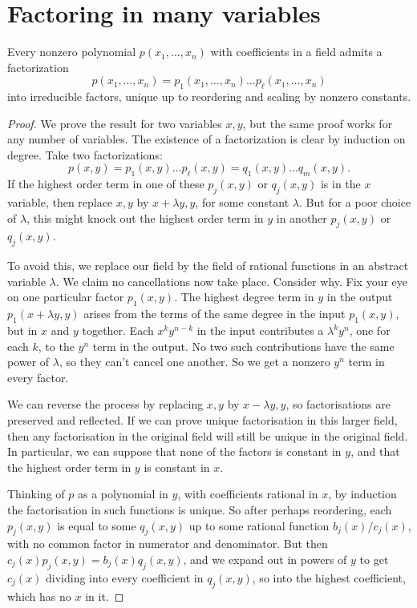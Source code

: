 \section{Factoring in many variables}
\begin{theorem}\label{theorem:ufd}
Every nonzero polynomial \(p(x_1,\dots,x_n)\) with coefficients in a field admits a factorization
\[
p(x_1,\dots,x_n)=p_1(x_1,\dots,x_n)\dots p_{\ell}(x_1,\dots,x_n)
\]
into irreducible factors, unique up to reordering and scaling by nonzero constants.
\end{theorem}
\begin{proof}
We prove the result for two variables \(x,y\), but the same proof works for any number of variables.
The existence of a factorization is clear by induction on degree.
Take two factorizations:
\[
p(x,y)=p_1(x,y)\dots p_{\ell}(x,y)=q_1(x,y)\dots q_m(x,y).
\]
If the highest order term in one of these \(p_j(x,y)\) or \(q_j(x,y)\) is in the \(x\) variable, then replace \(x,y\) by \(x+\lambda y,y\), for some constant \(\lambda\).
But for a poor choice of \(\lambda\), this might knock out the highest order term in \(y\) in another \(p_j(x,y)\) or \(q_j(x,y)\).

To avoid this, we replace our field by the field of rational functions in an abstract variable \(\lambda\).
We claim no cancellations now take place.
Consider why.
Fix your eye on one particular factor \(p_1(x,y)\).
The highest degree term in \(y\) in the output \(p_1(x+\lambda y,y)\) arises from the terms of the same degree in the input \(p_1(x,y)\), but in \(x\) and \(y\) together.
Each \(x^ky^{n-k}\) in the input contributes a \(\lambda^k y^n\), one for each \(k\), to the \(y^n\) term in the output.
No two such contributions have the same power of \(\lambda\), so they can't cancel one another.
So we get a nonzero \(y^n\) term in every factor.

We can reverse the process by replacing \(x,y\) by \(x-\lambda y,y\), so factorisations are preserved and reflected.
If we can prove unique factorisation in this larger field, then any factorisation in the original field will still be unique in the original field.
In particular, we can suppose that none of the factors is constant in \(y\), and that the highest order term in \(y\) is constant in \(x\).

Thinking of \(p\) as a polynomial in \(y\), with coefficients rational in \(x\), by induction the factorisation in such functions is unique.
So after perhaps reordering, each \(p_j(x,y)\) is equal to some \(q_j(x,y)\) up to some rational function \(b_j(x)/c_j(x)\), with no common factor in numerator and denominator.
But then \(c_j(x)p_j(x,y)=b_j(x)q_j(x,y)\), and we expand out in powers of \(y\) to get \(c_j(x)\) dividing into every coefficient in \(q_j(x,y)\), so into the highest coefficient, which has no \(x\) in it.
\end{proof}

